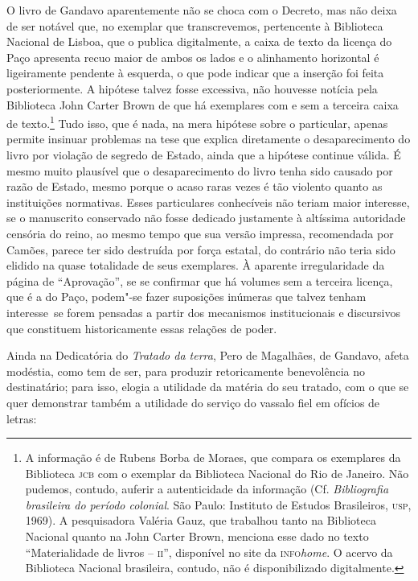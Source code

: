 O livro de Gandavo aparentemente não se choca com o Decreto, mas não
deixa de ser notável que, no exemplar que transcrevemos, pertencente à
Biblioteca Nacional de Lisboa, que o publica digitalmente, a caixa de
texto da licença do Paço apresenta recuo maior de ambos os lados e o
alinhamento horizontal é ligeiramente pendente à esquerda, o que pode
indicar que a inserção foi feita posteriormente. A hipótese talvez
fosse excessiva, não houvesse notícia pela Biblioteca John Carter Brown
de que há exemplares com e sem a terceira caixa de texto.\footnote{ A
informação é de Rubens Borba de Moraes, que compara os exemplares da
Biblioteca \textsc{jcb} com o exemplar da Biblioteca Nacional do Rio de Janeiro.
Não pudemos, contudo, auferir a autenticidade da informação (Cf.
\textit{Bibliografia brasileira do período colonial}. São Paulo: Instituto de
Estudos Brasileiros, \textsc{usp}, 1969). A pesquisadora Valéria Gauz, que
trabalhou tanto na Biblioteca Nacional quanto na John Carter Brown,
menciona esse dado no texto ``Materialidade de livros -- \textsc{ii}'', disponível no site da \textsc{info}\textit{home}. 
O acervo da Biblioteca Nacional brasileira, contudo, não é
disponibilizado digitalmente.} Tudo isso, que é nada, na mera hipótese
sobre o particular, apenas permite insinuar problemas na tese que
explica diretamente o desaparecimento do livro por violação de segredo
de Estado, ainda que a hipótese continue válida. É mesmo muito
plausível que o desaparecimento do livro tenha sido causado por razão
de Estado, mesmo porque o acaso raras vezes é tão violento quanto as
instituições normativas. Esses particulares conhecíveis não teriam
maior interesse, se o manuscrito conservado não fosse dedicado
justamente à altíssima autoridade censória do reino, ao mesmo tempo que
sua versão impressa, recomendada por Camões, parece ter sido destruída
por força estatal, do contrário não teria sido elidido na quase
totalidade de seus exemplares. À aparente irregularidade da página de
``Aprovação'', se se confirmar que há volumes
sem a terceira licença, que é a do Paço, podem"-se fazer suposições
inúmeras que talvez tenham \mbox{interesse se} forem pensadas a partir dos
mecanismos institucionais e discursivos que constituem historicamente
essas relações de poder.


Ainda na Dedicatória do \textit{Tratado da terra}, Pero de Magalhães, de
Gandavo, afeta modéstia, como tem de ser, para produzir retoricamente
benevolência no destinatário; para isso, elogia a utilidade da matéria
do seu tratado, com o que se quer demonstrar também a utilidade do
serviço do vassalo fiel em ofícios de letras:


